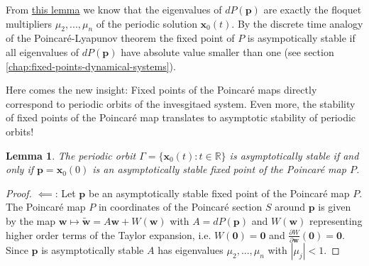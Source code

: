 \documentclass[hidelinks,a4paper, 11pt]{article}
\theoremstyle{plain}
\newtheorem{lemma}[theorem]{Lemma}
\theoremstyle{break}
\theoremstyle{plain}
\theoremstyle{definition}
\begin{document}
{From \hyperref[chapter:poincare-map-coordinate-lemma]{this lemma} we know that the eigenvalues of $dP(\mathbf p)$ are exactly the floquet multipliers $\mu_2,...,\mu_n$ of the periodic solution $\mathbf x_0(t)$. By the discrete time analogy of the Poincaré-Lyapunov theorem the fixed point of $P$ is asympotically stable if all eigenvalues of $dP(\mathbf p)$ have absolute value smaller than one (see section \ref{chap:fixed-points-dynamical-systems}).

Here comes the new insight: Fixed points of the Poincaré maps directly correspond to periodic orbits of the invesgitaed system. Even more, the stability of fixed points of the Poincaré map translates to asymptotic stability of periodic orbits!

\begin{lemma}\label{chapter:poincare-asymptotical-stable-lemma}
	The periodic orbit $\Gamma = \{ \mathbf x_0(t) : t \in \mathbb R \}$ is asymptotically stable if and only if $\mathbf p = \mathbf x_0(0)$ is an asymptotically stable fixed point of the Poincaré map $P$.
\end{lemma}

\begin{proof}
	$\impliedby$: Let $\mathbf p$ be an asymptotically stable fixed point of the Poincaré map $P$. The Poincaré map $P$ in coordinates of the Poincaré section $S$ around $\mathbf p$ is given by the map $\mathbf w \mapsto \mathbf{\tilde w} = A\mathbf w + W(\mathbf w)$ with $A = dP(\mathbf p)$ and $W(\mathbf w)$ representing higher order terms of the Taylor expansion, i.e. $W(\mathbf 0) = \mathbf 0$ and $\frac{\partial W}{\partial \mathbf w}(\mathbf 0) = \mathbf 0$. Since $\mathbf p$ is asymptotically stable $A$ has eigenvalues $\mu_2,...,\mu_n$ with $|\mu_j | < 1$.
	

\end{proof}}
\end{document}
